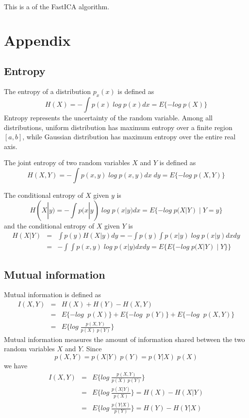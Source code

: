 This is a 
of the FastICA algorithm.

\section*{Appendix}

\subsection*{Entropy}

The entropy of a distribution $p_x(x)$ is defined as
\[	H(X)=-\int p(x)\; log\; p(x) dx=E\{ -log\;p(X) \}	\]
Entropy represents the uncertainty of the random variable. Among all
distributions, uniform distribution has maximum entropy over a finite
region $[a,b]$, while Gaussian distribution has maximum entropy over
the entire real axis.

The joint entropy of two random variables $X$ and $Y$ is defined as
\[ H(X,Y)=-\int p(x,y)\;log\;p(x,y) dx\;dy=E\{-log\;p(X,Y)\} \]

The conditional entropy of $X$ given $y$ is
\[	H(X|y)=-\int p(x|y)\;log\;p(x|y) dx=E\{-log\;p(X|Y) \;|\; Y=y\} \]
and the conditional entropy of $X$ given $Y$ is
\begin{eqnarray}
H(X|Y)&=&\int p(y) H(X|y) dy=-\int p(y) \int p(x|y)\;log\;p(x|y) dx dy
	\nonumber \\
	&=&-\int \int p(x,y)\;log\;p(x|y) dx dy
	=E\{E\{-log\;p(X|Y) \;|\; Y\} \}
	\nonumber
\end{eqnarray}

\subsection*{Mutual information}

Mutual information is defined as
\begin{eqnarray}
I(X,Y)&=&H(X)+H(Y)-H(X,Y)
	\nonumber \\
	&=&E\{ -log\;\;p(X)\}+E\{ -log\;\;p(Y)\}+E\{ -log\;\;p(X,Y)\}
	\nonumber \\
	&=&E\{ log\;\frac{p(X,Y)}{p(X)\;p(Y)} \}
	\nonumber
\end{eqnarray}
Mutual information measures the amount of information shared between the
two random variables $X$ and $Y$. Since
\[	p(X,Y)=p(X|Y) \; p(Y)=p(Y|X) \; p(X)	\]
we have
\begin{eqnarray}
I(X,Y)&=& E\{ log\;\frac{p(X,Y)}{p(X)\;p(Y)} \}
	\nonumber \\
	&=& E\{ log\;\frac{p(X|Y)}{p(X)} \}=H(X)-H(X|Y)
	\nonumber \\
	&=& E\{ log\;\frac{p(Y|X)}{p(Y)} \}=H(Y)-H(Y|X)
	\nonumber
\end{eqnarray}

